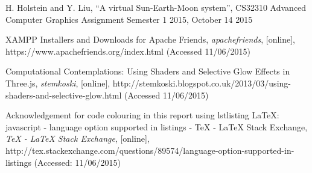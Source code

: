 \documentclass[12pt]{article}
\begin{document}
\begin{thebibliography}{1}

 H. Holstein and Y. Liu, ``A virtual Sun-Earth-Moon system'', CS32310 Advanced Computer Graphics Assignment Semester 1 2015, October 14 2015

 XAMPP Installers and Downloads for Apache Friends, {\em apachefriends}, [online], https://www.apachefriends.org/index.html (Accessed 11/06/2015)

 Computational Contemplations: Using Shaders and Selective Glow Effects in Three.js, {\em stemkoski}, [online],
http://stemkoski.blogspot.co.uk/2013/03/using-shaders-and-selective-glow.html (Accessed 11/06/2015)

  Acknowledgement for code colouring in this report using lstlisting LaTeX: javascript - language option supported in listings - TeX - LaTeX Stack Exchange, {\em TeX - LaTeX Stack Exchange}, [online], http://tex.stackexchange.com/questions/89574/language-option-supported-in-listings (Accessed: 11/06/2015)

\end{thebibliography}
\end{document}
